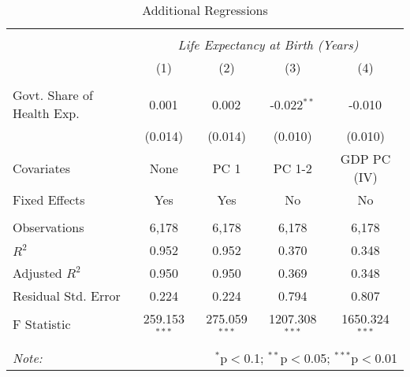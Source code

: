 \begin{table}[!htbp] \centering
  \caption{Additional Regressions \label{additional_regs}}
\begin{tabular}{@{\extracolsep{5pt}}lcccc}
\\[-1.8ex]\hline
\hline \\[-1.8ex]
& \multicolumn{4}{c}{\textit{Life Expectancy at Birth (Years)}} \
\cr \
\\[-1.8ex] & (1) & (2) & (3) & (4) \\
\hline \\[-1.8ex]
 Govt. Share of Health Exp. & 0.001$^{}$ & 0.002$^{}$ & -0.022$^{**}$ & -0.010$^{}$ \\
  & (0.014) & (0.014) & (0.010) & (0.010) \\
 Covariates & None & PC 1 & PC 1-2 & GDP PC (IV) \\
 Fixed Effects & Yes & Yes & No & No \\
\hline \\[-1.8ex]
 Observations & 6,178 & 6,178 & 6,178 & 6,178 \\
 $R^2$ & 0.952 & 0.952 & 0.370 & 0.348 \\
 Adjusted $R^2$ & 0.950 & 0.950 & 0.369 & 0.348 \\
 Residual Std. Error & 0.224 & 0.224 & 0.794 & 0.807  \\
 F Statistic & 259.153$^{***}$  & 275.059$^{***}$  & 1207.308$^{***}$  & 1650.324$^{***}$  \\
\hline
\hline \\[-1.8ex]
\textit{Note:} & \multicolumn{4}{r}{$^{*}$p$<$0.1; $^{**}$p$<$0.05; $^{***}$p$<$0.01} \\
\end{tabular}
\end{table}